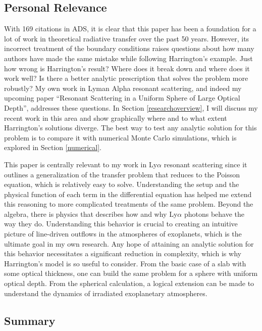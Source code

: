 \documentclass[onecolumn]{aastex63}
\begin{document}
\subsection{Personal Relevance}
With 169 citations in ADS, it is clear that this paper has been a foundation for a lot of work in theoretical radiative transfer over the past 50 years. However, its incorrect treatment of the boundary conditions raises questions about how many authors have made the same mistake while following Harrington's example. Just how wrong is Harrington's result? Where does it break down and where does it work well? Is there a better analytic prescription that solves the problem more robustly? My own work in Lyman Alpha resonant scattering, and indeed my upcoming paper ``Resonant Scattering in a Uniform Sphere of Large Optical Depth'', addresses these questions. In Section \ref{researchoverview}, I will discuss my recent work in this area and show graphically where and to what extent Harrington's solutions diverge. The best way to test any analytic solution for this problem is to compare it with numerical Monte Carlo simulations, which is explored in Section \ref{numerical}.

This paper is centrally relevant to my work in Ly$\alpha$ resonant scattering since it outlines a generalization of the transfer problem that reduces to the Poisson equation, which is relatively easy to solve. Understanding the setup and the physical function of each term in the differential equation has helped me extend this reasoning to more complicated treatments of the same problem. Beyond the algebra, there is physics that describes how and why Ly$\alpha$ photons behave the way they do. Understanding this behavior is crucial to creating an intuitive picture of line-driven outflows in the atmospheres of exoplanets, which is the ultimate goal in my own research. Any hope of attaining an analytic solution for this behavior necessitates a significant reduction in complexity, which is why Harrington's model is so useful to consider. From the basic case of a slab with some optical thickness, one can build the same problem for a sphere with uniform optical depth. From the spherical calculation, a logical extension can be made to understand the dynamics of irradiated exoplanetary atmospheres.


\subsection{Summary}
\end{document}
